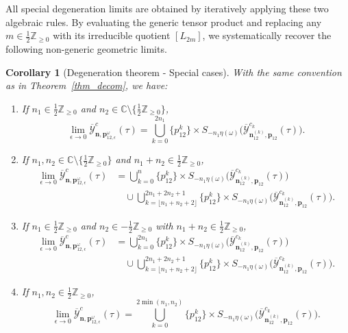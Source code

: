 \documentclass[11pt]{amsart}
\newtheorem{corollary}[theorem]{Corollary}
\theoremstyle{remark}
\numberwithin{equation}{section}
\begin{document}
All special degeneration limits are obtained by iteratively applying these two algebraic rules. By evaluating the generic tensor product and replacing any $m \in \tfrac{1}{2}\mathbb{Z}_{\geq 0}$ with its irreducible quotient $[L_{2m}]$, we systematically recover the following non-generic geometric limits.

\begin{corollary}[Degeneration theorem - Special cases] \label{cor:dege_special}
With the same convention as in Theorem~\ref{thm_decom}, we have:
\begin{enumerate}[label=(\arabic*)]
\item If $n_1 \in \tfrac{1}{2} \mathbb{Z}_{\geq 0}$ and $n_2 \in \mathbb{C} \setminus \{ \tfrac{1}{2} \mathbb{Z}_{\geq 0} \}$,
\[
    \lim_{\epsilon \to 0} \overline{\mathcal{Y}}_{\mathbf{n}, \mathbf{p}_{12, \epsilon}^\omega}^c(\tau) = \bigcup_{k=0}^{2n_1} \{p_{12}^k\} \times S_{-n_1 \eta(\omega)} \Big( \overline{\mathcal{Y}}^{c_k}_{\mathbf{n}_{12}^{(k)},\mathbf{p}_{12}}(\tau) \Big).
\]
\item If $n_1, n_2 \in \mathbb{C} \setminus \{ \tfrac{1}{2} \mathbb{Z}_{\geq 0} \}$ and $n_1+n_2 \in \tfrac{1}{2} \mathbb{Z}_{\geq 0}$, 
\[
\begin{split}
    \lim_{\epsilon \to 0} \overline{\mathcal{Y}}_{\mathbf{n}, \mathbf{p}_{12, \epsilon}^\omega}^c(\tau) &= \bigcup_{k=0}^{n} \{p_{12}^k\} \times S_{-n_1 \eta(\omega)} \Big( \overline{\mathcal{Y}}^{c_k}_{\mathbf{n}_{12}^{(k)},\mathbf{p}_{12}}(\tau) \Big) 
    \\
    &\quad \cup \bigcup_{k = \lfloor n_1+n_2+2 \rfloor}^{2n_1+2n_2+1} \{p_{12}^k\} \times S_{-n_1 \eta(\omega)} \Big( \overline{\mathcal{Y}}^{c_k}_{\mathbf{n}_{12}^{(k)},\mathbf{p}_{12}}(\tau) \Big).
\end{split}
\]
\item If $n_1 \in \tfrac{1}{2} \mathbb{Z}_{\geq 0}$ and $n_2 \in -\tfrac{1}{2} \mathbb{Z}_{\geq 0}$ with $n_1+ n_2 \in \tfrac{1}{2} \mathbb{Z}_{\geq 0}$, 
\[
\begin{split}
    \lim_{\epsilon \to 0} \overline{\mathcal{Y}}_{\mathbf{n}, \mathbf{p}_{12, \epsilon}^\omega}^c(\tau) &= \bigcup_{k=0}^{2n_1} \{p_{12}^k\} \times S_{-n_1 \eta(\omega)} \Big( \overline{\mathcal{Y}}^{c_k}_{\mathbf{n}_{12}^{(k)},\mathbf{p}_{12}}(\tau) \Big) 
    \\
    &\quad \cup \bigcup_{k = \lfloor n_1+n_2+2 \rfloor}^{2n_1+2n_2+1} \{p_{12}^k\} \times S_{-n_1 \eta(\omega)} \Big( \overline{\mathcal{Y}}^{c_k}_{\mathbf{n}_{12}^{(k)},\mathbf{p}_{12}}(\tau) \Big).
\end{split}
\]
\item If $n_1, n_2 \in \tfrac{1}{2} \mathbb{Z}_{\geq 0}$,
\[
    \lim_{\epsilon \to 0} \overline{\mathcal{Y}}_{\mathbf{n}, \mathbf{p}_{12, \epsilon}^\omega}^c(\tau) = \bigcup_{k=0}^{2\min(n_1,n_2)} \{p_{12}^k\} \times S_{-n_1 \eta(\omega)} \Big( \overline{\mathcal{Y}}^{c_k}_{\mathbf{n}_{12}^{(k)},\mathbf{p}_{12}}(\tau) \Big).
\]
\end{enumerate}
\end{corollary}
\end{document}
